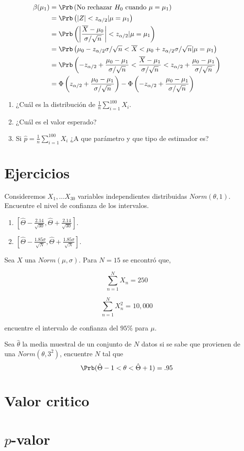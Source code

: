 \documentclass{assignment}
\begin{document}
\begin{align*}
\beta(\mu_1) & = \Prb \left( \text{No rechazar } H_0 \text{ cuando } \mu=\mu_1 \right) \\
& = \Prb \left( |Z|<z_{\alpha/2}| \mu=\mu_1 \right) \\
& = \Prb \left( \left|\frac{\overline{X}-\mu_0}{\sigma/\sqrt{n}} \right|<z_{\alpha/2}| \mu=\mu_1 \right) \\
& = \Prb \left(\mu_0 - z_{\alpha/2} \sigma/\sqrt{n}  < \overline{X} <  \mu_0 + z_{\alpha/2} \sigma/\sqrt{n}| \mu=\mu_1 \right) \\
& = \Prb \left(- z_{\alpha/2} + \frac{\mu_0-\mu_1}{\sigma/\sqrt{n}}  < \frac{\overline{X}-\mu_1}{\sigma/\sqrt{n}} <  z_{\alpha/2} + \frac{\mu_0-\mu_1}{\sigma/\sqrt{n}}\right) \\
& = \Phi \left( z_{\alpha/2} + \frac{\mu_0-\mu_1}{\sigma/\sqrt{n}} \right) - \Phi \left( -z_{\alpha/2} + \frac{\mu_0-\mu_1}{\sigma/\sqrt{n}}\right) \\
\end{align*} 
\begin{enumerate}
	\item ¿Cuál es la distribución de $\frac{1}{n}\sum_{i=1}^{100} X_i$.
	\item ¿Cuál es el valor esperado?
	\item Si $\hat{p}=\frac{1}{n}\sum_{i=1}^{100} X_i$ ¿A que parámetro y que tipo de estimador es?
\end{enumerate}

\section*{Ejercicios}
Consideremos $X_1, \dots X_{30}$ variables independientes distribuidas $Norm(\theta,1)$. Encuentre el nivel de confianza de los intervalos.

\begin{enumerate}
	\item $\left[\hat{\Theta}-\frac{2.14}{\sqrt{30}},\hat{\Theta}+\frac{2.14}{\sqrt{30}} \right]$.
	\item $\left[\hat{\Theta}-\frac{1.85 \sigma}{\sqrt{N}},\hat{\Theta}+\frac{1.85 \sigma}{\sqrt{N}} \right]$.
\end{enumerate}

Sea $X$ una $Norm(\mu,\sigma)$. Para $N=15$ se encontró que,

\[
\sum_{n=1}^N X_n = 250
\]

\[
\sum_{n=1}^N X_n^2 = 10,000
\]

encuentre el intervalo de confianza del $95\%$ para $\mu.$

Sea $\hat{\theta}$ la media muestral de un conjunto de $N$ datos si se sabe que provienen de una $Norm(\theta,3^2)$, encuentre $N$ tal que 
\[
\Prb(\hat{\Theta}-1<\theta < \hat{\Theta}+1)=.95
\] 
\section{Valor critico}

\section{$p$-valor}

\
\end{document}
